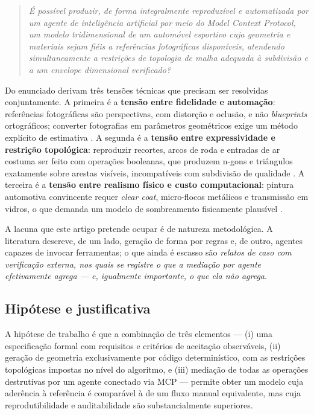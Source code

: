 \begin{quote}
\emph{\'E poss\'ivel produzir, de forma integralmente reproduz\'ivel e automatizada por um
agente de intelig\^encia artificial por meio do Model Context Protocol, um modelo
tridimensional de um autom\'ovel esportivo cuja geometria e materiais sejam fi\'eis a
refer\^encias fotogr\'aficas dispon\'iveis, atendendo simultaneamente a restri\c{c}\~oes de
topologia de malha adequada \`a subdivis\~ao e a um envelope dimensional verificado?}
\end{quote}

Do enunciado derivam tr\^es tens\~oes t\'ecnicas que precisam ser resolvidas conjuntamente. A
primeira \'e a \textbf{tens\~ao entre fidelidade e automa\c{c}\~ao}: refer\^encias
fotogr\'aficas s\~ao perspectivas, com distor\c{c}\~ao e oclus\~ao, e n\~ao \emph{blueprints}
ortogr\'aficos; converter fotografias em par\^ametros geom\'etricos exige um m\'etodo
expl\'icito de estimativa \cite{hartley2004}. A segunda \'e a \textbf{tens\~ao entre
expressividade e restri\c{c}\~ao topol\'ogica}: reproduzir recortes, arcos de roda e
entradas de ar costuma ser feito com opera\c{c}\~oes booleanas, que produzem n-gons e
tri\^angulos exatamente sobre arestas vis\'iveis, incompat\'iveis com subdivis\~ao de
qualidade \cite{catmull1978, bbotsch2010}. A terceira \'e a \textbf{tens\~ao entre realismo
f\'isico e custo computacional}: pintura automotiva convincente requer
\emph{clear coat}, micro-flocos met\'alicos e transmiss\~ao em vidros, o que demanda um
modelo de sombreamento fisicamente plaus\'ivel \cite{burley2012, karis2013, walter2007}.

A lacuna que este artigo pretende ocupar \'e de natureza metodol\'ogica. A literatura
descreve, de um lado, gera\c{c}\~ao de forma por regras e, de outro, agentes capazes de
invocar ferramentas; o que ainda \'e escasso s\~ao \emph{relatos de caso com
verifica\c{c}\~ao externa, nos quais se registre o que a media\c{c}\~ao por agente
efetivamente agrega --- e, igualmente importante, o que ela n\~ao agrega}.

\subsection{Hip\'otese e justificativa}

A hip\'otese de trabalho \'e que a combina\c{c}\~ao de tr\^es elementos --- (i) uma
especifica\c{c}\~ao formal com requisitos e crit\'erios de aceita\c{c}\~ao observ\'aveis,
(ii) gera\c{c}\~ao de geometria exclusivamente por c\'odigo determin\'istico, com as
restri\c{c}\~oes topol\'ogicas impostas no n\'ivel do algoritmo, e (iii) media\c{c}\~ao de
todas as opera\c{c}\~oes destrutivas por um agente conectado via MCP --- permite obter um
modelo cuja ader\^encia \`a refer\^encia \'e compar\'avel \`a de um fluxo manual equivalente,
mas cuja reprodutibilidade e auditabilidade s\~ao substancialmente superiores.

